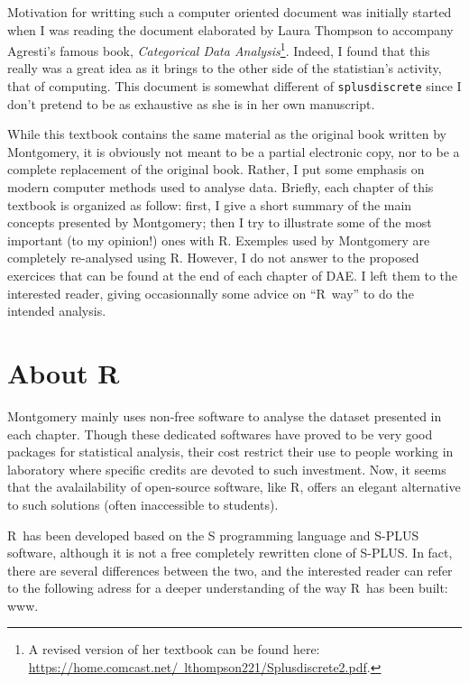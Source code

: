 \documentclass[11pt,a4paper]{memoir}\usepackage[]{graphicx}\usepackage[]{color}
\newcommand{\R}{\textsf{R}}
\begin{document}
Motivation for writting such a computer oriented document was initially
started when I was reading the document elaborated by Laura Thompson to
accompany Agresti's famous book, \emph{Categorical Data Analysis}\footnote{A
revised version of her textbook can be found here:
\href{https://home.comcast.net/~lthompson221/Splusdiscrete2.pdf}%
{https://home.comcast.net/~lthompson221/Splusdiscrete2.pdf}.}. Indeed, I found
that this really was a great idea as it brings to the other side of the
statistian's activity, that of computing. This document is somewhat different
of \texttt{splusdiscrete} since I don't pretend to be as exhaustive as she is
in her own manuscript.

While this textbook contains the same material as the original book written by
Montgomery, it is obviously not meant to be a partial electronic copy, nor to
be a complete replacement of the original book. Rather, I put some emphasis on
modern computer methods used to analyse data. Briefly, each chapter of this
textbook is organized as follow: first, I give a short summary of the main
concepts presented by Montgomery; then I try to illustrate some of the most
important (to my opinion!)  ones with \R. Exemples used by Montgomery are
completely re-analysed using \R. However, I do not answer to the proposed
exercices that can be found at the end of each chapter of DAE. I left them to
the interested reader, giving occasionnally some advice on ``\R\ way'' to do
the intended analysis.


\section*{About R}
\label{sec:about-r}
Montgomery mainly uses non-free software to analyse the dataset presented in
each chapter. Though these dedicated softwares have proved to be very good
packages for statistical analysis, their cost restrict their use to people
working in laboratory where specific credits are devoted to such
investment. Now, it seems that the avalailability of open-source software,
like \R, offers an elegant alternative to such solutions (often inaccessible
to students).
 
\R\ has been developed based on the \textsf{S} programming language and
\textsf{S-PLUS} software, although it is not a free completely rewritten clone
of \textsf{S-PLUS}. In fact, there are several differences between the two,
and the interested reader can refer to the following adress for a deeper
understanding of the way \R\ has been built: www.
\end{document}
